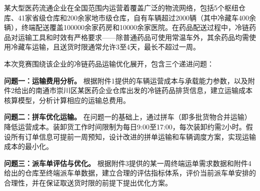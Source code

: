 某大型医药流通企业在全国范围内运营着覆盖广泛的物流网络，包括5个枢纽仓库、41家省级仓库和200余家地市级仓库，自有车辆超过2000辆（其中冷藏车400余辆），终端配送覆盖100000余家药房和10000余家医院。在药品配送过程中，冷链药品对运输工具和时效有严格要求——除普通药品可使用常温车外，其余药品均需使用冷藏车运输，且送货时限通常允许3至4天，最长不超过一周。

本次竞赛围绕该企业的冷链药品运输优化展开，包含三个递进问题：

\textbf{问题一：运输费用分析。} 根据附件1提供的车辆运营成本与承载能力参数，以及附件2给出的南通市崇川区某医药企业仓库出发的冷链药品排货信息，建立运输成本核算模型，分析计算相应的运输总费用。

\textbf{问题二：拼车优化运输。} 在问题一的基础上，通过拼车（即多批货物合并运输）降低运营成本。装卸货工作时间限制为每日9:00至17:00，每次装卸约需2小时。假设所有订单信息可提前一周预知，设计改进的拼单运输和车辆调度方案，实现运输成本的最小化。

\textbf{问题三：派车单评估与优化。} 根据附件3提供的某一周终端运单需求数据和附件4给出的仓库至终端派车单数据，建立合理的评估指标体系，评价当前派车单安排的合理性，并在保证取送货时限的前提下提出优化方案。